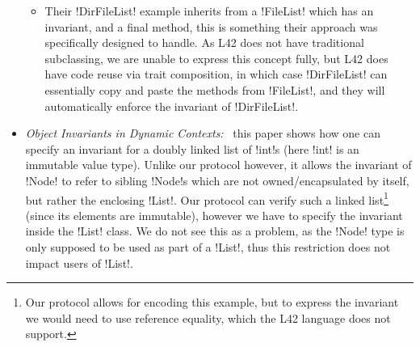 \begin{itemize}
\begin{itemize}
		\item Their \Q!DirFileList! example inherits from a \Q!FileList! which has an invariant, and a final method, this is something their approach was specifically designed to handle. As L42 does not have traditional subclassing, we are unable to express this concept fully, but L42 does have code reuse via trait composition, in which case \Q!DirFileList! can essentially copy and paste the methods from \Q!FileList!, and they will automatically enforce the invariant of \Q!DirFileList!. %
	\end{itemize}

	\item \emph{Object Invariants in Dynamic Contexts:}~\cite{leino2004object} this paper shows how one can specify an invariant for a doubly linked list of \Q!int!s (here \Q!int! is an immutable value type). Unlike our protocol however, it allows the invariant of \Q!Node! to refer to sibling \Q!Node!s which are not owned/encapsulated by itself, but rather the enclosing \Q!List!. Our protocol can verify such a linked list\footnote{%
Our protocol allows for encoding this example, but
to express the invariant we would need to 
use reference equality, which the L42 language does not support.
} (since its elements are immutable), however we have to specify the invariant inside the \Q!List! class. We do not see this as a problem, as the \Q!Node! type is only supposed to be used as part of a \Q!List!, thus this restriction does not impact users of \Q!List!.
	

\end{itemize}

